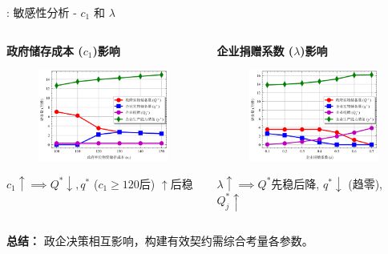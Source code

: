 \documentclass[9pt]{beamer}
\begin{document}
\begin{frame}{\insertsectionhead: 敏感性分析 - $c_1$ 和 $\lambda$}
    \begin{columns}[T]
        \begin{column}{0.5\textwidth}
            \textbf{政府储存成本 ($c_1$)影响}
            \begin{figure}
                \includegraphics[width=\linewidth]{basic_pictures/sensitivity_c1.png}
                \caption*{}
            \end{figure}
            \footnotesize $c_1 \uparrow \implies Q^* \downarrow, q^*$ ($c_1 \ge 120$后) $\uparrow$后稳
        \end{column}
        \begin{column}{0.5\textwidth}
            \textbf{企业捐赠系数 ($\lambda$)影响}
            \begin{figure}
                \includegraphics[width=\linewidth]{basic_pictures/sensitivity_lam.png}
                \caption*{}
            \end{figure}
            \footnotesize $\lambda \uparrow \implies Q^*$先稳后降, $q^* \downarrow$ (趋零), $Q_j^* \uparrow$
        \end{column}
    \end{columns}
    \textbf{总结：} 政企决策相互影响，构建有效契约需综合考量各参数。
\end{frame}
\end{document}
